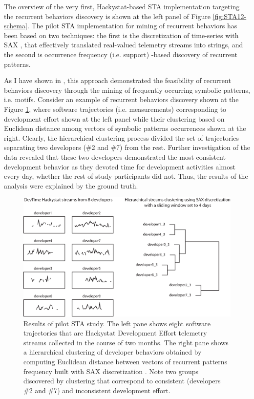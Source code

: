 The overview of the very first, Hackystat-based STA implementation targeting the recurrent behaviors 
discovery is shown at the left panel of Figure  \ref{fig:STA12-schema}.
The pilot STA implementation for mining of recurrent behaviors has been based on two techniques: the first is the 
discretization of time-series with SAX \cite{sax}, that effectively translated real-valued telemetry streams 
into strings, and the second is occurrence frequency (i.e. support) -based discovery of recurrent patterns.

As I have shown in \cite{csdl2-10-09}, this approach demonstrated the feasibility of recurrent behaviors discovery 
through the mining of frequently occurring symbolic patterns, i.e. motifs. 
Consider an example of recurrent behaviors discovery shown at the Figure \ref{fig:STA1-results}, where software 
trajectories (i.e. measurements) corresponding to development effort shown at the left panel while their clustering based on Euclidean 
distance among vectors of symbolic patterns occurrences shown at the right. Clearly, the hierarchical clustering 
process divided the set of trajectories separating two developers (\#2 and \#7) from the rest. 
Further investigation of the data revealed that these two developers demonstrated the most consistent development 
behavior as they devoted time for development activities almost every day, whether the rest of study participants 
did not. Thus, the results of the analysis were explained by the ground truth.

\begin{figure}[t]
   \centering
   \includegraphics[width=145mm]{figures/STA1.eps}
   \caption{Results of pilot STA study. 
   The left pane shows eight software trajectories that are Hackystat Development Effort telemetry streams \cite{citeulike:557296} 
   collected in the course of two months.
   The right pane shows a hierarchical clustering of developer behaviors obtained by computing Euclidean distance between vectors
   of recurrent patterns frequency built with SAX discretization \cite{sax}. 
   Note two groups discovered by clustering that correspond to consistent (developers \#2 and \#7) and inconsistent development effort.}
   \label{fig:STA1-results}
\end{figure}


